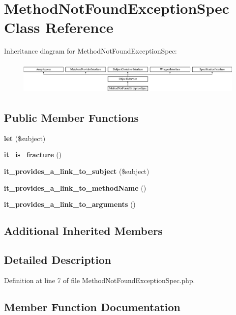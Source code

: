 \section{Method\+Not\+Found\+Exception\+Spec Class Reference}
\label{classspec_1_1_php_spec_1_1_exception_1_1_fracture_1_1_method_not_found_exception_spec}
Inheritance diagram for Method\+Not\+Found\+Exception\+Spec\+:\begin{figure}[H]
\begin{center}
\leavevmode
\includegraphics[height=1.671642cm]{classspec_1_1_php_spec_1_1_exception_1_1_fracture_1_1_method_not_found_exception_spec}
\end{center}
\end{figure}
\subsection*{Public Member Functions}
\begin{DoxyCompactItemize}
\item 
{\bf let} (\$subject)
\item 
{\bf it\+\_\+is\+\_\+fracture} ()
\item 
{\bf it\+\_\+provides\+\_\+a\+\_\+link\+\_\+to\+\_\+subject} (\$subject)
\item 
{\bf it\+\_\+provides\+\_\+a\+\_\+link\+\_\+to\+\_\+method\+Name} ()
\item 
{\bf it\+\_\+provides\+\_\+a\+\_\+link\+\_\+to\+\_\+arguments} ()
\end{DoxyCompactItemize}
\subsection*{Additional Inherited Members}


\subsection{Detailed Description}


Definition at line 7 of file Method\+Not\+Found\+Exception\+Spec.\+php.



\subsection{Member Function Documentation}
